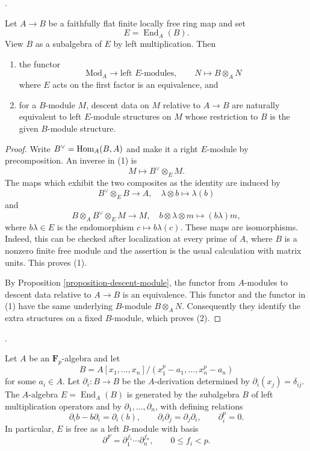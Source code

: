 \begin{lemma}
\label{lemma-finite-locally-free-endomorphism-descent}
\begin{reference}
\cite[Expos\'e 190, n\textsuperscript{o} 3, pp. 319--322]{FGA}.
\end{reference}
Let $A \to B$ be a faithfully flat finite locally free ring map and set
$$
E = \operatorname{End}_A(B).
$$
View $B$ as a subalgebra of $E$ by left multiplication. Then
\begin{enumerate}
\item the functor
$$
\text{Mod}_A \longrightarrow \text{left }E\text{-modules},
\qquad N \longmapsto B \otimes_A N
$$
where $E$ acts on the first factor is an equivalence, and
\item for a $B$-module $M$, descent data on $M$ relative to $A \to B$
are naturally equivalent to left $E$-module structures on $M$ whose
restriction to $B$ is the given $B$-module structure.
\end{enumerate}
\end{lemma}

\begin{proof}
Write $B^\vee = \mathop{\mathrm{Hom}}\nolimits_A(B, A)$ and make it a right $E$-module by
precomposition. An inverse in (1) is
$$
M \longmapsto B^\vee \otimes_E M.
$$
The maps which exhibit the two composites as the identity are induced by
$$
B^\vee \otimes_E B \longrightarrow A,
\quad \lambda \otimes b \longmapsto \lambda(b)
$$
and
$$
B \otimes_A B^\vee \otimes_E M \longrightarrow M,
\quad b \otimes \lambda \otimes m \longmapsto (b\lambda)m,
$$
where $b\lambda \in E$ is the endomorphism $c \mapsto b\lambda(c)$.
These maps are isomorphisms. Indeed, this can be checked after localization
at every prime of $A$, where $B$ is a nonzero finite free module and the
assertion is the usual calculation with matrix units. This proves (1).

By Proposition \ref{proposition-descent-module}, the functor from $A$-modules
to descent data relative to $A \to B$ is an equivalence. This functor and the
functor in (1) have the same underlying $B$-module $B \otimes_A N$.
Consequently they identify the extra structures on a fixed $B$-module,
which proves (2).
\end{proof}

\begin{lemma}
\label{lemma-height-one-differential-operators}
\begin{reference}
\cite[Expos\'e 190, n\textsuperscript{o} 3, p. 321]{FGA}.
\end{reference}
Let $A$ be an $\mathbf{F}_p$-algebra and let
$$
B = A[x_1, \ldots, x_n]/(x_1^p-a_1, \ldots, x_n^p-a_n)
$$
for some $a_i \in A$. Let $\partial_i : B \to B$ be the $A$-derivation
determined by $\partial_i(x_j) = \delta_{ij}$. The $A$-algebra
$E = \operatorname{End}_A(B)$ is generated by the subalgebra $B$ of left multiplication
operators and by $\partial_1, \ldots, \partial_n$, with defining relations
$$
\partial_i b - b\partial_i = \partial_i(b),
\qquad
\partial_i\partial_j = \partial_j\partial_i,
\qquad
\partial_i^p = 0.
$$
In particular, $E$ is free as a left $B$-module with basis
$$
\partial^F = \partial_1^{f_1} \cdots \partial_n^{f_n},
\qquad 0 \leq f_i < p.
$$
\end{lemma}

